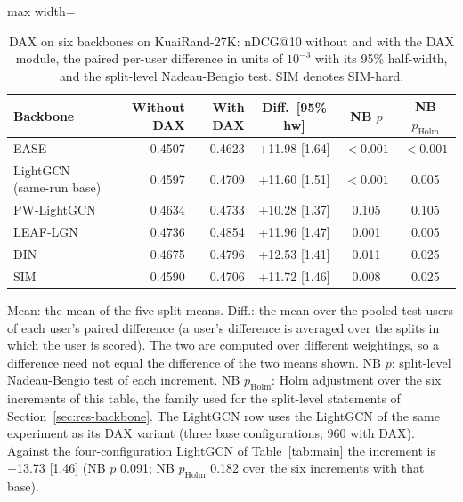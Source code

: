 \begin{table}[tbp]
\centering
\footnotesize
\caption{DAX on six backbones on KuaiRand-27K: nDCG@10 without and with the DAX module, the paired per-user difference in units of $10^{-3}$ with its 95\% half-width, and the split-level Nadeau-Bengio test. SIM denotes SIM-hard.}
\label{tab:backbone}
\begin{adjustbox}{max width=\linewidth}
\begin{tabular}{lrrccc}
\toprule
Backbone & Without DAX & With DAX & Diff.\ [95\% hw] & NB $p$ & NB $p_{\mathrm{Holm}}$ \\
\midrule
EASE & 0.4507 & 0.4623 & +11.98 [1.64] & $<0.001$ & $<0.001$ \\
LightGCN (same-run base) & 0.4597 & 0.4709 & +11.60 [1.51] & $<0.001$ & 0.005 \\
PW-LightGCN & 0.4634 & 0.4733 & +10.28 [1.37] & 0.105 & 0.105 \\
LEAF-LGN & 0.4736 & 0.4854 & +11.96 [1.47] & 0.001 & 0.005 \\
DIN & 0.4675 & 0.4796 & +12.53 [1.41] & 0.011 & 0.025 \\
SIM & 0.4590 & 0.4706 & +11.72 [1.46] & 0.008 & 0.025 \\
\bottomrule
\end{tabular}
\end{adjustbox}
\par\smallskip
\begin{minipage}{\linewidth}\raggedright\footnotesize Mean: the mean of the five split means. Diff.: the mean over the pooled test users of each user's paired difference (a user's difference is averaged over the splits in which the user is scored). The two are computed over different weightings, so a difference need not equal the difference of the two means shown. NB $p$: split-level Nadeau-Bengio test of each increment. NB $p_{\mathrm{Holm}}$: Holm adjustment over the six increments of this table, the family used for the split-level statements of Section~\ref{sec:res-backbone}. The LightGCN row uses the LightGCN of the same experiment as its DAX variant (three base configurations; 960 with DAX). Against the four-configuration LightGCN of Table~\ref{tab:main} the increment is +13.73 [1.46] (NB $p$ 0.091; NB $p_{\mathrm{Holm}}$ 0.182 over the six increments with that base).\end{minipage}
\end{table}
